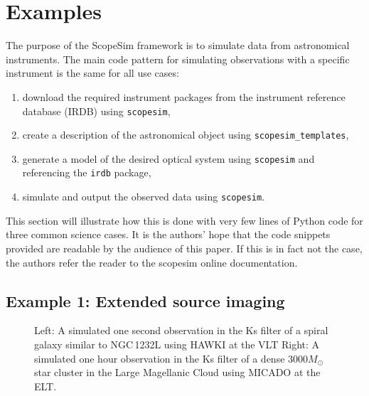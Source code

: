 

\section{Examples}
\label{examples}

The purpose of the ScopeSim framework is to simulate data from astronomical instruments.
The main code pattern for simulating observations with a specific instrument is the same for all use cases:

\begin{enumerate}
\item download the required instrument packages from the instrument reference database (IRDB) using \lstinline{scopesim},

\item create a description of the astronomical object using \lstinline{scopesim_templates},

\item generate a model of the desired optical system using \lstinline{scopesim} and referencing the \lstinline{irdb} package,

\item simulate and output the observed data using \lstinline{scopesim}.
\end{enumerate}

This section will illustrate how this is done with very few lines of Python code for three common science cases.
It is the authors' hope that the code snippets provided are readable by the audience of this paper.
If this is in fact not the case, the authors refer the reader to the scopesim online documentation.


\subsection{Example 1: Extended source imaging}
\label{example-1-extended-source-imaging}

\begin{figure}

\caption{Left: A simulated one second observation in the Ks filter of a spiral galaxy similar to NGC\,1232L using HAWKI at the VLT
Right: A simulated one hour observation in the Ks filter of a dense $3000 M_{\odot}$ star cluster in the Large Magellanic Cloud using MICADO at the ELT.}
\label{fig:combined_1_2}

\end{figure}

